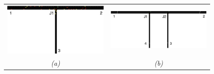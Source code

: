 \documentclass[numbered]{trbunofficial}
\begin{document}
\begin{figure}
	\centering
	\begin{tabular}{cc}
		\includegraphics[width=0.2\paperwidth]{./pictures/simpleT2.png} &
		\includegraphics[width=0.26\paperwidth]{./pictures/twinT.png}\\
		\small\emph{(a)} & \small\emph{(b)} \\[0.1cm]

\end{tabular}
\end{figure}
\end{document}
